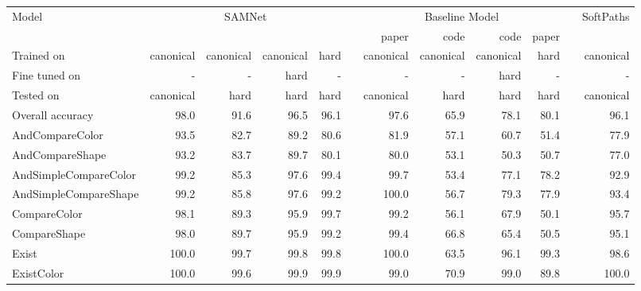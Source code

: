 \begin{table*}[htb]
	\centering
	\begin{adjustbox}{width=\columnwidth}
		\begin{tabular}{l r r r r r r r r r r r}
			\toprule[1.25pt]
			Model & \multicolumn{4}{c}{SAMNet} &  &\multicolumn{4}{c}{Baseline Model} & & SoftPaths \\
			\cmidrule(lr){2-5} 
			\cmidrule(lr){7-10} 
			\cmidrule(lr){12-12}
			&&&&& & paper & code & code & paper\\
			\cmidrule(lr){7-10} 
			Trained on       & canonical & canonical & canonical & hard &           &  canonical  & canonical  & canonical & hard & & canonical\\ 
			Fine tuned on  & - & - & hard  & - &           & -   & - & hard & - & & -\\ 
			Tested on        & canonical & hard & hard & hard &            &canonical  & hard & hard & hard & & canonical \\ 
			\midrule[1pt]	
			Overall accuracy & 98.0 & 91.6 & 96.5  & 96.1 &           & 97.6  & 65.9 & 78.1& 80.1     &   &  96.1  \\ 
			\midrule[1pt] 
			AndCompareColor    &    93.5    &    82.7    &    89.2    &    80.6    &    &    81.9    &    57.1    &    60.7    &    51.4    &   &    77.9    \\
			AndCompareShape    &    93.2    &    83.7    &    89.7    &    80.1    &    &    80.0    &    53.1    &    50.3    &    50.7    &   &    77.0    \\
			AndSimpleCompareColor    &    99.2    &    85.3    &    97.6    &    99.4    &    &    99.7    &    53.4    &    77.1    &    78.2    &   &    92.9    \\
			AndSimpleCompareShape    &    99.2    &    85.8    &    97.6    &    99.2    &    &    100.0    &    56.7    &    79.3    &    77.9    &   &    93.4    \\
			CompareColor    &    98.1    &    89.3    &    95.9    &    99.7    &    &    99.2    &    56.1    &    67.9    &    50.1    &   &    95.7    \\
			CompareShape    &    98.0    &    89.7    &    95.9    &    99.2    &    &    99.4    &    66.8    &    65.4    &    50.5    &   &    95.1    \\
			Exist    &    100.0    &    99.7    &    99.8    &    99.8    &    &    100.0    &    63.5    &    96.1    &    99.3    &   &    98.6    \\
			ExistColor    &    100.0    &    99.6    &    99.9    &    99.9    &    &    99.0    &    70.9    &    99.0    &    89.8    &   &    100.0    \\

\end{tabular}
\end{adjustbox}
\end{table*}
